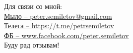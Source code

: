 Для связи со мной:\\ \href{mailto:peter.semiletov@gmail.com}{Мыло –  peter.semiletov@gmail.com}\\ 
\href{https://t.me/petrsemiletov}{Телега – https://t.me/petrsemiletov}\\
\href{https://www.facebook.com/peter.semiletov}{ФБ – www.facebook.com/peter.semiletov}\\


Буду рад отзывам!